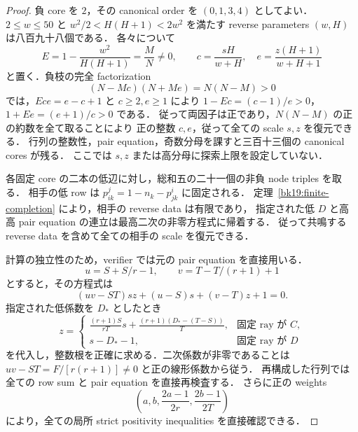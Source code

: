 \begin{proof}
負 core を $2$，その canonical order を $(0,1,3,4)$ としてよい．
$2\le w\le50$ と $w^2/2<H(H+1)<2w^2$ を満たす
reverse parameters $(w,H)$ は八百九十八個である．
各々について
\[
 E=1-\frac{w^2}{H(H+1)}=\frac MN\ne0,\qquad
 c=\frac{sH}{w+H},\quad e=\frac{z(H+1)}{w+H+1}
\]
と置く．負枝の完全 factorization
\begin{equation}\label{bn21:factorization}
 (N-Mc)(N+Me)=N(N-M)>0
\end{equation}
では，$Ece=e-c+1$ と $c\ge2,e\ge1$ により
$1-Ec=(c-1)/e>0$，$1+Ee=(e+1)/c>0$ である．
従って両因子は正であり，$N(N-M)$ の正の約数を全て取ることにより
正の整数 $c,e$，従って全ての scale $s,z$ を復元できる．
行列の整数性，pair equation，奇数分母を課すと三百十三個の canonical cores が残る．
ここでは $s,z$ または高分母に探索上限を設定していない．

各固定 core の二本の低辺に対し，総和五の二十一個の非負 node triples を取る．
相手の低 row は $p^j_{ik}=1-n_k-p^i_{jk}$ に固定される．
定理~\ref{bk19:finite-completion} により，相手の reverse data は有限であり，
指定された低 $D$ と高高 pair equation の連立は最高二次の非零方程式に帰着する．
従って共鳴する reverse data を含めて全ての相手の scale を復元できる．

計算の独立性のため，verifier では元の pair equation を直接用いる．
\[
 u=S+S/r-1,\qquad v=T-T/(r+1)+1
\]
とすると，その方程式は
\[
 (uv-ST)sz+(u-S)s+(v-T)z+1=0.
\]
指定された低係数を $D_*$ としたとき
\[
 z=\begin{cases}
 \displaystyle\frac{(r+1)S}{rT}s+
 \frac{(r+1)(D_*-(T-S))}{T},&\text{固定 ray が }C,\\[4pt]
 s-D_*-1,&\text{固定 ray が }D
 \end{cases}
\]
を代入し，整数根を正確に求める．二次係数が非零であることは
$uv-ST=F/[r(r+1)]\ne0$ と正の線形係数から従う．
再構成した行列では全ての row sum と pair equation を直接再検査する．
さらに正の weights
\[
 \left(a,b,\frac{2a-1}{2r},\frac{2b-1}{2T}\right)
\]
により，全ての局所 strict positivity inequalities を直接確認できる．


\end{proof}

